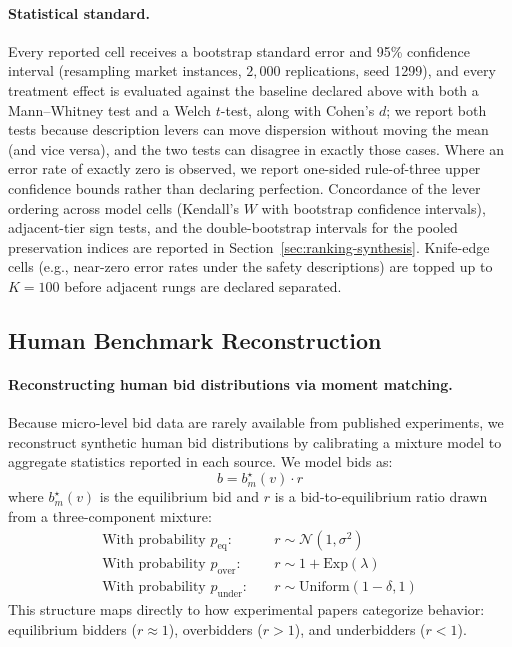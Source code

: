 \paragraph{Statistical standard.}
Every reported cell receives a bootstrap standard error and 95\% confidence
interval (resampling market instances, $2{,}000$ replications, seed 1299), and
every treatment effect is evaluated against the baseline declared above with
both a Mann--Whitney test and a Welch $t$-test, along with Cohen's $d$; we
report both tests because description levers can move dispersion without
moving the mean (and vice versa), and the two tests can disagree in exactly
those cases. Where an error rate of exactly zero is observed, we report
one-sided rule-of-three upper confidence bounds rather than declaring
perfection. Concordance of the lever ordering across
model cells (Kendall's $W$ with bootstrap confidence intervals),
adjacent-tier sign tests, and the double-bootstrap intervals for the pooled
preservation indices are reported in Section~\ref{sec:ranking-synthesis}.
Knife-edge cells (e.g., near-zero error rates under the safety descriptions)
are topped up to $K=100$ before adjacent rungs are declared
separated.

\subsection{Human Benchmark Reconstruction}\label{sec:reconstruction}

\paragraph{Reconstructing human bid distributions via moment matching.}
Because micro-level bid data are rarely available from published experiments,
we reconstruct synthetic human bid distributions by calibrating a mixture model
to aggregate statistics reported in each source. We model bids as:
\[
b = b^\star_m(v) \cdot r
\]
where $b^\star_m(v)$ is the equilibrium bid and $r$ is a bid-to-equilibrium
ratio drawn from a three-component mixture:
\begin{align*}
\text{With probability } p_{\text{eq}}: \quad & r \sim \mathcal{N}(1, \sigma^2) \\
\text{With probability } p_{\text{over}}: \quad & r \sim 1 + \text{Exp}(\lambda) \\
\text{With probability } p_{\text{under}}: \quad & r \sim \text{Uniform}(1-\delta, 1)
\end{align*}
This structure maps directly to how experimental papers categorize behavior:
equilibrium bidders ($r \approx 1$), overbidders ($r > 1$), and underbidders
($r < 1$).

